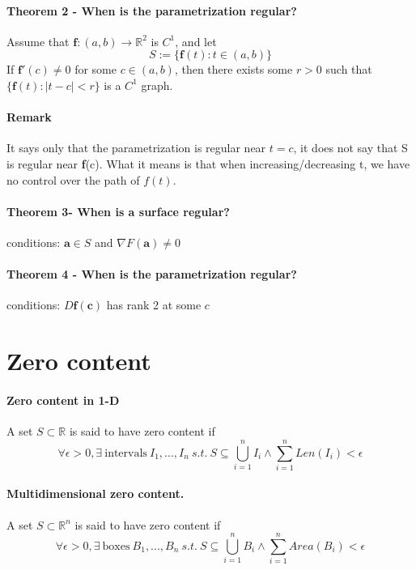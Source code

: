\documentclass[11pt]{article}
\newcommand{\tb}[1]{\textbf{#1}}
\newcommand{\real}[0]{\mathbb{R}}
\newcommand{\func}[3]{\tb{#1}: {#2} \rightarrow {#3} }
\begin{document}
\paragraph{Theorem 2 - When is the parametrization regular?} 
Assume that $\func{f}{(a, b)}{\real ^2}$ is $C^1$, and let
$$S:=\{ \tb{f}(t): t \in (a, b)\}$$
If $\tb{f}'(c) \neq 0$ for some $c \in (a, b)$, then there exists some $r>0$ such that $\{ \tb{f} (t): |t-c| < r\}$ is a $C^1$ graph. \newline
\paragraph{Remark}
It says only that the parametrization is regular near $t = c$, it does not say that S is regular near \tb{f}(c). What it means is that when increasing/decreasing t, we have no control over the path of $f(t)$.
\paragraph{Theorem 3- When is a surface regular?}
conditions: $\tb{a} \in S$ and $\nabla F(\tb{a}) \neq 0$
\paragraph{Theorem 4 - When is the parametrization regular?}
conditions: $D\tb{f}(\tb{c})$ has rank 2 at some $c$

\section{Zero content}
\paragraph{Zero content in 1-D} A set $S\subset \real$ is said to have zero content if
\begin{equation*}
    \forall \epsilon > 0, \exists~\text{intervals}~I_1,...,I_n ~s.t.~ S\subseteq \bigcup_{i=1}^{n}I_i \wedge \sum_{i=1}^{n}{Len(I_i)} < \epsilon
\end{equation*}

\paragraph{Multidimensional zero content.} A set $S\subset \real^n$ is said to have zero content if
\begin{equation*}
    \forall \epsilon > 0, \exists~\text{boxes}~B_1,...,B_n~s.t.~S\subseteq \bigcup_{i=1}^{n}B_i \wedge \sum_{i=1}^{n}{Area(B_i)} < \epsilon
\end{equation*}
\end{document}
